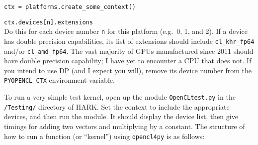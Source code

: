 \documentclass[12pt,pdftex,letterpaper]{article}
\begin{document}
\texttt{ctx = platforms.create\_some\_context()}

\texttt{ctx.devices[n].extensions}\\
Do this for each device number \texttt{n} for this platform (e.g.\ 0, 1, and 2).  If a device has double precision capabilities, its list of extensions should include \texttt{cl\_khr\_fp64} and/or \texttt{cl\_amd\_fp64}.  The vast majority of GPUs manufactured since 2011 should have double precision capability; I have yet to encounter a CPU that does not.  If you intend to use DP (and I expect you will), remove its device number from the \texttt{PYOPENCL\_CTX} environment variable.

To run a very simple test kernel, open up the module \texttt{OpenCLtest.py} in the \texttt{/Testing/} directory of HARK.  Set the context to include the appropriate devices, and then run the module.  It should display the device list, then give timings for adding two vectors and multiplying by a constant.  The structure of how to run a function (or ``kernel'') using \texttt{opencl4py} is as follows:
\end{document}
